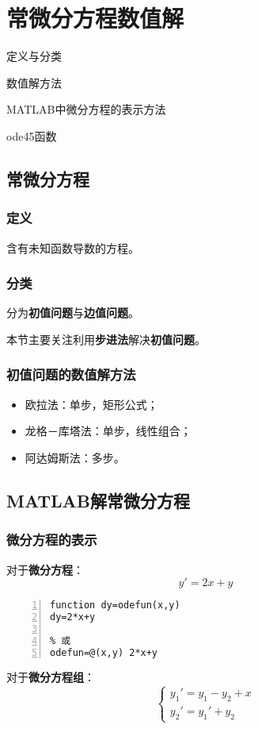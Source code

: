 \chapter{常微分方程数值解}
\begin{introduction}
\item 定义与分类
\item 数值解方法
\item MATLAB中微分方程的表示方法
\item ode45函数
\end{introduction}
\section{常微分方程}
\subsection{定义}
含有未知函数导数的方程。
\subsection{分类}
分为\textbf{初值问题}与\textbf{边值问题}。

本节主要关注利用\textbf{步进法}解决\textbf{初值问题}。
\subsection{初值问题的数值解方法}
\begin{itemize}
  \item 欧拉法：单步，矩形公式；
  \item 龙格－库塔法：单步，线性组合；
  \item 阿达姆斯法：多步。
\end{itemize}
\section{MATLAB解常微分方程}
\subsection{微分方程的表示}
对于\textcolor{third}{\textbf{微分方程}}：
\[y'=2x+y\]
\begin{lstlisting}[frame=single,numbers=left]
% 可表示为
function dy=odefun(x,y)
dy=2*x+y

% 或
odefun=@(x,y) 2*x+y
\end{lstlisting}

对于\textcolor{third}{\textbf{微分方程组}}：
\[
\begin{cases}
y_1'=y_1-y_2+x\\
y_2'=y_1'+y_2
\end{cases} \]

